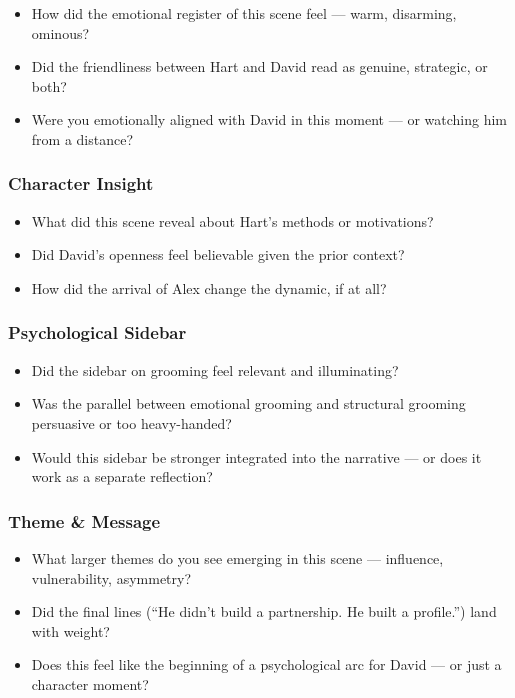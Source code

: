 \begin{itemize}
  \item How did the emotional register of this scene feel — warm, disarming, ominous?
  \item Did the friendliness between Hart and David read as genuine, strategic, or both?
  \item Were you emotionally aligned with David in this moment — or watching him from a distance?
\end{itemize}

\subsubsection{Character Insight}

\begin{itemize}
  \item What did this scene reveal about Hart’s methods or motivations?
  \item Did David’s openness feel believable given the prior context?
  \item How did the arrival of Alex change the dynamic, if at all?
\end{itemize}

\subsubsection{Psychological Sidebar}

\begin{itemize}
  \item Did the sidebar on grooming feel relevant and illuminating?
  \item Was the parallel between emotional grooming and structural grooming persuasive or too heavy-handed?
  \item Would this sidebar be stronger integrated into the narrative — or does it work as a separate reflection?
\end{itemize}

\subsubsection{Theme \& Message}

\begin{itemize}
  \item What larger themes do you see emerging in this scene — influence, vulnerability, asymmetry?
  \item Did the final lines (“He didn’t build a partnership. He built a profile.”) land with weight?
  \item Does this feel like the beginning of a psychological arc for David — or just a character moment?
\end{itemize}

